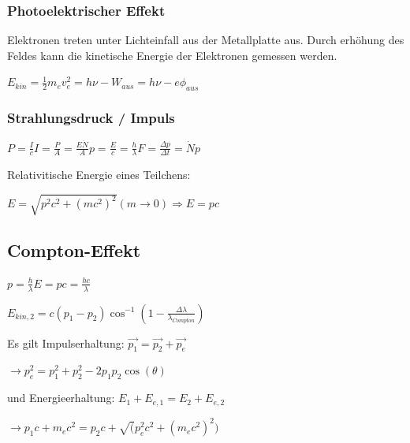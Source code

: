 \documentclass[10pt,a4paper]{scrartcl}
\begin{document}
\begin{multicols*}{3}
	\subsubsection{Photoelektrischer Effekt}
	
	Elektronen treten unter Lichteinfall aus der Metallplatte aus. Durch erhöhung des Feldes kann die kinetische Energie der Elektronen gemessen werden.
	
	$E_{kin}=\frac{1}{2}m_ev_e^2=h\nu-W_{aus}=h\nu-e\phi_{aus}$
	
	
	 
	
	\subsubsection{Strahlungsdruck / Impuls}
	
	$P=\frac{I}{c}$\hfill$I=\frac{P}{A}=\frac{E\dot{N}}{A}$\hfill$p = \frac{E}{c}=\frac{h}{\lambda}$\hfill$F=\frac{\Delta p}{\Delta t}=\dot{N} p$
	
	
	Relativitische Energie eines Teilchens: 
	
	$E = \sqrt{p^2c^2+(mc^2)^2}$\hfill$(m\rightarrow 0)\Rightarrow E = pc$
	
	 
	
	\subsection{Compton-Effekt}
	
	
	$p=\frac{h}{\lambda}$\hfill$E=pc=\frac{hc}{\lambda}$
	
	$E_{kin,2}=c(p_1-p_2)$\hfill$\cos^{-1}(1-\frac{\Delta\lambda}{\lambda_{Compton}})$
	
	Es gilt Impulserhaltung: $\vec{p_1}=\vec{p_2}+\vec{p_e}$
	
	$\rightarrow p_e^2=p_1^2+p_2^2-2p_1p_2\cos(\theta)$
	
	und Energieerhaltung: $E_1+E_{e,1}=E_2+E_{e,2}$
	
	$\rightarrow p_1c+m_ec^2=p_2c+\sqrt(p_e^2c^2+(m_ec^2)^2) $
	

\end{multicols*}
\end{document}
